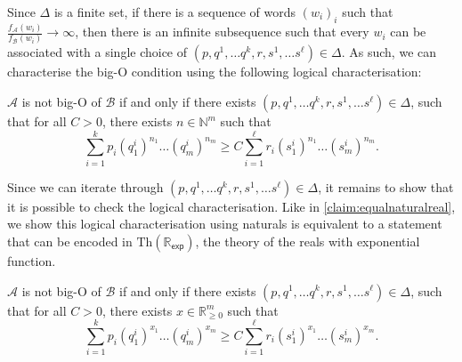 \documentclass{lmcs}
\theoremstyle{plain}
\theoremstyle{definition}
\theoremstyle{remark}
\newcommand{\rexp}{$\mathrm{Th}(\mathbb R_{\mathsf{exp}})$}
\begin{document}
Since $\Delta$ is a finite set, if there is a sequence of words $(w_i)_i$ such that $\frac{f_\mathcal{A}(w_i)}{f_\mathcal{B}(w_i)} \to\infty$, then there is an infinite subsequence such that every $w_i$ can be associated with a single choice of $({p},{q}^1,\dots {q}^{k}, {r},{s}^1,\dots {s}^{\ell}) \in \Delta$. As such, we can characterise the big-O condition using the following logical characterisation:
\begin{lem}
$\mathcal{A}$ is not big-O of $\mathcal{B}$ if and only if there exists $({p},{q}^1,\dots {q}^{k}, {r},{s}^1,\dots {s}^{\ell}) \in \Delta$, such that for all $C > 0$, there exists ${n} \in \mathbb{N}^m$ such that  \[ \sum_{i=1}^{k} p_i{({q}^i_1)}^{n_1}\dots {({q}^i_m)}^{n_m} \ge C\sum_{i=1}^{\ell} r_i{({s}^i_1)}^{n_1}\dots {({s}^i_m)}^{n_m}.\]
\end{lem}
Since we can iterate through $({p},{q}^1,\dots {q}^{k}, {r},{s}^1,\dots {s}^{\ell}) \in \Delta$, it remains to show that it is possible to check the logical characterisation. Like in \cref{claim:equalnaturalreal}, we show this logical characterisation using naturals is equivalent to a statement that  can be encoded in \rexp, the theory of the reals with exponential function.

\begin{lem}\label{lemma:finrealversion}
$\mathcal{A}$ is not big-O of $\mathcal{B}$ if and only if there exists $({p},{q}^1,\dots {q}^{k}, {r},{s}^1,\dots {s}^{\ell}) \in \Delta$, such that for all $C > 0$, there exists ${x} \in \mathbb{R}_{\ge 0}^m$ such that  \[ \sum_{i=1}^{k} p_i{({q}^i_1)}^{x_1}\dots {({q}^i_m)}^{x_m} \ge C \sum_{i=1}^{\ell} r_i{({s}^i_1)}^{x_1}\dots {({s}^i_m)}^{x_m}.\]
\end{lem}
\end{document}
